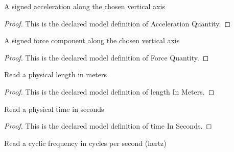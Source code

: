 \begin{definition}
  \label{def:physics:phyx-mini-0205:phyxminiproblems-problemphyxmini0205-accelerationquantity}
  A signed acceleration along the chosen vertical axis
\end{definition}
\begin{proof}
  This is the declared model definition of Acceleration Quantity.
\end{proof}
\begin{definition}
  \label{def:physics:phyx-mini-0205:phyxminiproblems-problemphyxmini0205-forcequantity}
  A signed force component along the chosen vertical axis
\end{definition}
\begin{proof}
  This is the declared model definition of Force Quantity.
\end{proof}
\begin{definition}
  \label{def:physics:phyx-mini-0205:phyxminiproblems-problemphyxmini0205-lengthinmeters}
  Read a physical length in meters
\end{definition}
\begin{proof}
  This is the declared model definition of length In Meters.
\end{proof}
\begin{definition}
  \label{def:physics:phyx-mini-0205:phyxminiproblems-problemphyxmini0205-timeinseconds}
  Read a physical time in seconds
\end{definition}
\begin{proof}
  This is the declared model definition of time In Seconds.
\end{proof}
\begin{definition}
  \label{def:physics:phyx-mini-0205:phyxminiproblems-problemphyxmini0205-frequencyinhertz}
  Read a cyclic frequency in cycles per second (hertz)
\end{definition}
